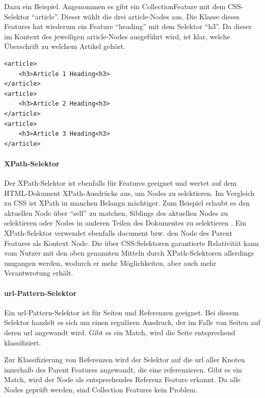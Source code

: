         Dazu ein Beispiel. Angenommen es gibt ein CollectionFeature mit dem CSS-Selektor
        "`article"'. Dieser wählt die drei article-Nodes aus.
        Die Klasse dieses Features hat wiederum ein Feature "`heading"' mit dem Selektor
        "`h3"'.
        Da dieser im Kontext des jeweiligen article-Nodes ausgeführt wird,
        ist klar, welche Überschrift zu welchem Artikel gehört.

        \begin{lstlisting}
<article>
    <h3>Article 1 Heading<h3>
</article>
<article>
    <h3>Article 2 Heading<h3>
</article>
<article>
    <h3>Article 3 Heading<h3>
</article>
        \end{lstlisting}

        \paragraph{XPath-Selektor}
        Der XPath-Selektor ist ebenfalls für Features geeignet und wertet auf dem
        HTML-Dokument XPath-Ausdrücke aus, um Nodes zu selektieren.
        Im Vergleich zu CSS ist XPath in manchen Belangn mächtiger.
        Zum Beispiel erlaubt es den aktuellen Node über "`self"' zu matchen,
        Siblings des aktuellen Nodes zu selektieren
        oder Nodes in anderen Teilen des Dokumentes zu selektieren \cite{w3c:xpath}.
        Ein XPath-Selektor verwendet ebenfalls document bzw. den Node des Parent Features als
        Kontext Node.
        Die über CSS-Selektoren garantierte Relativität kann vom Nutzer mit den oben genannten Mitteln
        durch XPath-Selektoren allerdings umgangen werden,
        wodurch er mehr Möglichkeiten, aber auch mehr Verantwrotung erhält.

        \paragraph{\gls{url}-Pattern-Selektor}
        Ein \gls{url}-Pattern-Selektor ist für Seiten und Referenzen geeignet.
        Bei diesem Selektor handelt es sich um einen regulären Ausdruck,
        der im Falle von Seiten auf deren \gls{url} angewandt wird.
        Gibt es ein Match, wird die Seite entsprechend klassifiziert.
        
        Zur Klassifizierung von Referenzen wird der Selektor auf die \gls{url} aller Knoten
        innerhalb des Parent Features angewandt, die eine {\resource} referenzieren.
        Gibt es ein Match, wird der Node als entsprechendes Referenz Feature erkannt.
        Da alle Nodes geprüft werden, sind Collection Features kein Problem.

